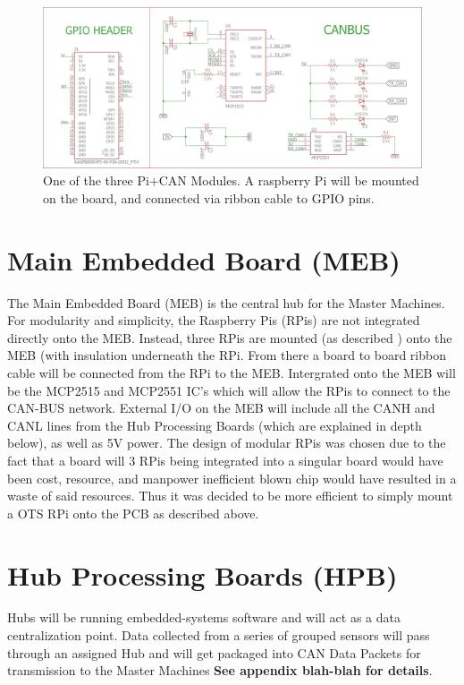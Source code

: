 \documentclass[main.tex]{subfiles}
\begin{document}
      \begin{figure}
        \centering
        \includegraphics[width=\textwidth]{images/MEB_Module.png}
        \caption{One of the three Pi+CAN Modules. A raspberry Pi will be mounted on the board, and connected via ribbon cable to GPIO pins.}
        \label{fig:meb-module}
    \end{figure}

    \section{Main Embedded Board (MEB)}
    The Main Embedded Board (MEB) is the central hub for the Master Machines. For modularity and simplicity, the Raspberry Pis (RPis) are not integrated directly onto the MEB. Instead, three RPis are mounted (as described ) onto the MEB (with insulation underneath the RPi. From there a board to board ribbon cable will be connected from the RPi to the MEB. Intergrated onto the MEB will be the MCP2515 and MCP2551 IC's which will allow the RPis to connect to the CAN-BUS network. External I/O on the MEB will include all the CANH and CANL lines from the Hub Processing Boards (which are explained in depth below), as well as 5V power. The design of modular RPis was chosen due to the fact that a board will 3 RPis being integrated into a singular board would have been cost, resource, and manpower inefficient
blown chip would have resulted in a waste of said resources. Thus it was decided to be more efficient to simply mount a OTS RPi onto the PCB as described above.


    \section{Hub Processing Boards (HPB)}
   	Hubs will be running embedded-systems software and will act as a data centralization point. Data collected from a series of grouped sensors will pass through an assigned Hub and will get packaged into CAN Data Packets for transmission to the Master Machines \textbf{See appendix blah-blah for details}.\\
\end{document}
